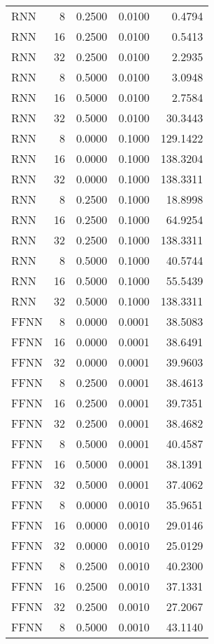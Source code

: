 \begin{table}[h!]
\begin{adjustbox}{max width=\textwidth}
\begin{tabular}{lrrrr}
  RNN &     8 & 0.2500 & 0.0100 & 0.4794 \\ 
  RNN &    16 & 0.2500 & 0.0100 & 0.5413 \\ 
  RNN &    32 & 0.2500 & 0.0100 & 2.2935 \\ 
  RNN &     8 & 0.5000 & 0.0100 & 3.0948 \\ 
  RNN &    16 & 0.5000 & 0.0100 & 2.7584 \\ 
  RNN &    32 & 0.5000 & 0.0100 & 30.3443 \\ 
  RNN &     8 & 0.0000 & 0.1000 & 129.1422 \\ 
  RNN &    16 & 0.0000 & 0.1000 & 138.3204 \\ 
  RNN &    32 & 0.0000 & 0.1000 & 138.3311 \\ 
  RNN &     8 & 0.2500 & 0.1000 & 18.8998 \\ 
  RNN &    16 & 0.2500 & 0.1000 & 64.9254 \\ 
  RNN &    32 & 0.2500 & 0.1000 & 138.3311 \\ 
  RNN &     8 & 0.5000 & 0.1000 & 40.5744 \\ 
  RNN &    16 & 0.5000 & 0.1000 & 55.5439 \\ 
  RNN &    32 & 0.5000 & 0.1000 & 138.3311 \\ 
  FFNN &     8 & 0.0000 & 0.0001 & 38.5083 \\ 
  FFNN &    16 & 0.0000 & 0.0001 & 38.6491 \\ 
  FFNN &    32 & 0.0000 & 0.0001 & 39.9603 \\ 
  FFNN &     8 & 0.2500 & 0.0001 & 38.4613 \\ 
  FFNN &    16 & 0.2500 & 0.0001 & 39.7351 \\ 
  FFNN &    32 & 0.2500 & 0.0001 & 38.4682 \\ 
  FFNN &     8 & 0.5000 & 0.0001 & 40.4587 \\ 
  FFNN &    16 & 0.5000 & 0.0001 & 38.1391 \\ 
  FFNN &    32 & 0.5000 & 0.0001 & 37.4062 \\ 
  FFNN &     8 & 0.0000 & 0.0010 & 35.9651 \\ 
  FFNN &    16 & 0.0000 & 0.0010 & 29.0146 \\ 
  FFNN &    32 & 0.0000 & 0.0010 & 25.0129 \\ 
  FFNN &     8 & 0.2500 & 0.0010 & 40.2300 \\ 
  FFNN &    16 & 0.2500 & 0.0010 & 37.1331 \\ 
  FFNN &    32 & 0.2500 & 0.0010 & 27.2067 \\ 
  FFNN &     8 & 0.5000 & 0.0010 & 43.1140 \\ 

\end{tabular}
\end{adjustbox}
\end{table}
